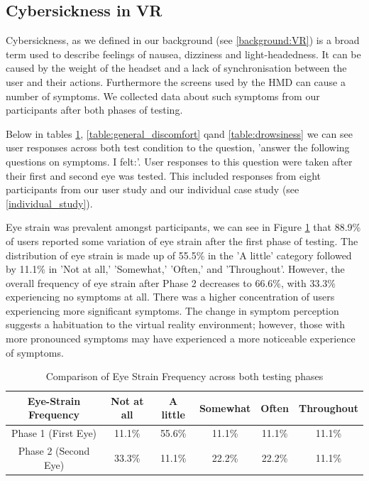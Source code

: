 \documentclass{l4proj}
\begin{document}
\subsection{Cybersickness in VR}
Cybersickness, as we defined in our background (see \ref{background:VR}) is a broad term used to describe feelings of nausea, dizziness and light-headedness. It can be caused by the weight of the headset and a lack of synchronisation between the user and their actions. Furthermore the screens used by the HMD can cause a number of symptoms. We collected data about such symptoms from our participants after both phases of testing.

Below in tables \ref{table:eye_strain}, \ref{table:general_discomfort} qand \ref{table:drowsiness} we can see user responses across both test condition to the question, 'answer the following questions on symptoms. I felt:'. User responses to this question were taken after their first and second eye was tested. This included responses from eight participants from our user study and our individual case study (see \ref{individual_study}).

Eye strain was prevalent amongst participants, we can see in Figure \ref{table:eye_strain} that 88.9\% of users reported some variation of eye strain after the first phase of testing. The distribution of eye strain is made up of 55.5\% in the 'A little' category followed by 11.1\% in 'Not at all,' 'Somewhat,' 'Often,' and 'Throughout'. However, the overall frequency of eye strain after Phase 2 decreases to 66.6\%, with 33.3\% experiencing no symptoms at all. There was a higher concentration of users experiencing more significant symptoms. The change in symptom perception suggests a habituation to the virtual reality environment; however, those with more pronounced symptoms may have experienced a more noticeable experience of symptoms.
\begin{table}[h] 
    \centering
    \caption{Comparison of Eye Strain Frequency across both testing phases}
    \begin{tabular}{|c|c|c|c|c|c|}
        \hline
        \textbf{Eye-Strain Frequency} & Not at all & A little & Somewhat & Often & Throughout \\
        \hline
        Phase 1 (First Eye) & 11.1\%  & 55.6\% & 11.1\% & 11.1\% & 11.1\%\\
        \hline
        Phase 2 (Second Eye) & 33.3\% & 11.1\% & 22.2\% & 22.2\% & 11.1\%\\
        \hline
    \end{tabular}
    \label{table:eye_strain}
\end{table}
\end{document}
